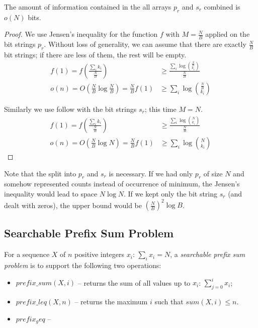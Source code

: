 \begin{lemma}
	The amount of information contained in the all arrays $p_r$ and $s_r$ combined is $o(N)$ bits.
\end{lemma}
\begin{proof}
	We use Jensen's inequality for the function $f$ with $M = \frac{N}{B}$ applied on the bit strings $p_r$.
	Without loss of generality, we can assume that there are exactly $\frac{N}{B}$ bit strings; if there are less of them, the rest will be empty.
	\begin{align*}
		f(1) = f\left(\frac{\sum_i k_i}{\frac{N}{B}}\right) &\ge \frac{\sum_i \log {\frac{N}{B} \choose k_i}}{\frac{N}{B}} \\
		o(n) = O\left(\frac{N}{B} \log \frac{N}{B}\right) = \frac{N}{B} f(1) &\ge \sum_i \log {\frac{N}{B} \choose k_i}
	\end{align*}
	
	Similarly we use follow with the bit strings $s_r$; this time $M = N$.
	\begin{align*}
		f(1) = f\left(\frac{\sum_i k_i}{\frac{N}{B}}\right) &\ge \frac{\sum_i \log {N \choose k_i}}{\frac{N}{B}} \\
		o(n) = O\left(\frac{N}{B} \log N\right) = \frac{N}{B} f(1) &\ge \sum_i \log {N \choose k_i}
	\end{align*}
\end{proof}

Note that the split into $p_r$ and $s_r$ is necessary.
If we had only $p_r$ of size $N$ and somehow represented counts instead of occurrence of minimum, the Jensen's inequality would lead to space $N \log N$.
If we kept only the bit string $s_r$ (and dealt with zeros), the upper bound would be $\left(\frac{N}{B}\right)^2 \log B$.

\subsection{Searchable Prefix Sum Problem}


For a sequence $X$ of $n$ positive integers $x_i$: $\sum_i x_i = N$, a \emph{searchable prefix sum problem} is to support the following two operations:
\begin{itemize}
	\item $prefix\_sum(X, i)$ -- returns the sum of all values up to $x_i$: $\sum_{j=0}^i x_i$;
	\item $prefix\_leq(X, n)$ -- returns the maximum $i$ such that $sum(X, i) \le n$.
	\item $prefix_geq$ -- 
\end{itemize}

